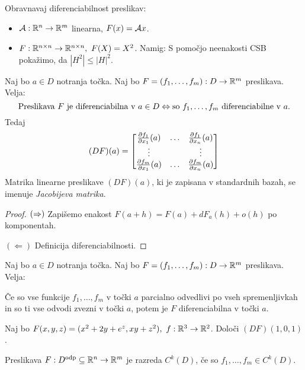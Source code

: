 \begin{zgled}
    Obravnavaj diferenciabilnost preslikav:
    \begin{itemize}
        \item $\mathcal{A}: \mathbb{R}^n \to \mathbb{R}^m$ linearna, $F(x) = \mathcal{A}x$.
        \item $F: \mathbb{R}^{n \times n} \to \mathbb{R}^{n \times n}, \ F(X) = X^2$.         
        Namig: S pomočjo neenakosti CSB pokažimo, da $|H^2| \leq |H|^2$.
    \end{itemize}
\end{zgled}

\begin{izrek}
    Naj bo $a \in D$ notranja točka. Naj bo $F = (f_1, \ldots, f_m): D \to \mathbb{R}^m$ preslikava. Velja: 
    $$\text{Preslikava } F \text{ je diferenciabilna v } a \in D \Leftrightarrow \text{so } f_1, \ldots, f_m \text{ diferenciabilne v } a.$$
    Tedaj
    $$(DF)(a) = \begin{bmatrix}
        \frac{\partial f_1}{\partial x_1}(a) & \ldots & \frac{\partial f_1}{\partial x_n}(a) \\
        \vdots & & \vdots \\
        \frac{\partial f_m}{\partial x_1}(a) & \ldots & \frac{\partial f_m}{\partial x_n}(a) 
    \end{bmatrix}$$
    Matrika linearne preslikave $(DF)(a)$, ki je zapisana v standardnih bazah, se imenuje \emph{Jacobijeva matrika}.
\end{izrek}

\begin{proof}
    $(\Rightarrow)$ Zapišemo enakost $F(a+h) = F(a) + dF_a(h) + o(h)$ po komponentah.

    $(\Leftarrow)$ Definicija diferenciabilnosti.
\end{proof}

\begin{posledica}
    Naj bo $a \in D$ notranja točka. Naj bo $F = (f_1, \ldots, f_m): D \to \mathbb{R}^m$ preslikava. Velja:
    
    Če so vse funkcije $f_1, \ldots, f_m$ v točki $a$ parcialno odvedlivi po vseh spremenljivkah in so ti vse odvodi zvezni v točki $a$, potem je $F$ diferenciabilna v točki $a$.
\end{posledica}

\begin{zgled}
    Naj bo $F(x,y,z) = (x^2+2y+e^z, xy+z^2), \ f: \R^3 \to \R^2$. Določi $(DF)(1,0,1)$.
\end{zgled}

\begin{definicija}
    Preslikava $F: D^{\text{odp}} \subseteq \mathbb{R}^n \to \mathbb{R}^m$ je razreda $C^k(D)$, če so $f_1, \ldots, f_m \in C^k(D)$.
\end{definicija}


